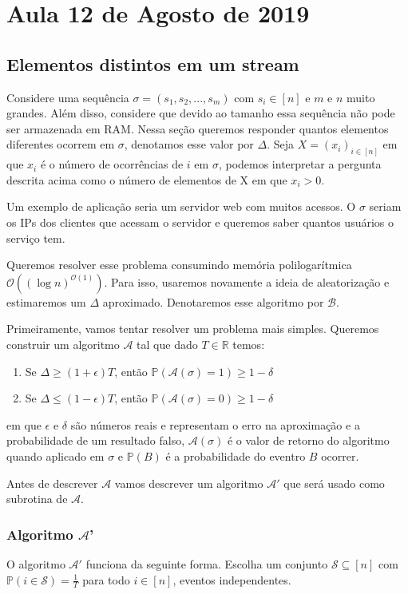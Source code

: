 \section{Aula 12 de Agosto de 2019}
\label{2019_08_12}
\subsection{Elementos distintos em um stream}
Considere uma sequência $\sigma = (s_1, s_2, ..., s_m)$ com $s_i \in [n]$ e $m$ e $n$ muito grandes. Além disso, considere que devido ao tamanho essa sequência não pode ser armazenada em RAM. Nessa seção queremos responder quantos elementos diferentes ocorrem em $\sigma$, denotamos esse valor por $\Delta$. Seja $X = (x_i)_{i \in [n]}$ em que $x_i$ é o número de ocorrências de $i$ em $\sigma$, podemos interpretar a pergunta descrita acima como o número de elementos de X em que $x_i>0$.


Um exemplo de aplicação seria um servidor web com muitos acessos. O $\sigma$ seriam os IPs dos clientes que acessam o servidor e queremos saber quantos usuários o serviço tem.


Queremos resolver esse problema consumindo memória polilogarítmica $\mathcal{O}((\log{}n)^{\mathcal{O}(1)})$. Para isso, usaremos novamente a ideia de aleatorização e estimaremos um $\Delta$ aproximado. Denotaremos esse algoritmo por $\mathcal{B}$.


Primeiramente, vamos tentar resolver um problema mais simples. Queremos construir um algoritmo $\mathcal{A}$ tal que dado $T \in \mathbb{R}$ temos:
\begin{enumerate}
    \centering
    \item Se $\Delta \geq (1+\epsilon)T$, então $\mathbb{P}(\mathcal{A}(\sigma) = 1) \geq 1 - \delta$
    \item Se $\Delta \leq (1-\epsilon)T$, então $\mathbb{P}(\mathcal{A}(\sigma) = 0) \geq 1 - \delta$
\end{enumerate}
em que $\epsilon$ e $\delta$ são números reais e representam o erro na aproximação e a probabilidade de um resultado falso, $\mathcal{A}(\sigma)$ é o valor de retorno do algoritmo quando aplicado em $\sigma$ e $\mathbb{P}(B)$ é a probabilidade do eventro $B$ ocorrer.


Antes de descrever $\mathcal{A}$ vamos descrever um algoritmo $\mathcal{A}'$ que será usado como subrotina de $\mathcal{A}$.

\subsubsection{Algoritmo $\mathcal{A}$'}O algoritmo $\mathcal{A}'$ funciona da seguinte forma. Escolha um conjunto $\mathcal{S} \subseteq [n]$ com $\mathbb{P}( i \in \mathcal{S}) = \frac{1}{T}$ para todo $i \in [n]$, eventos independentes.

